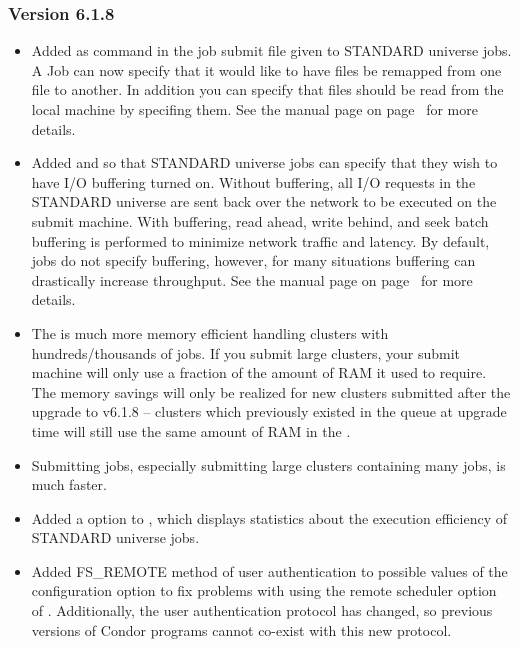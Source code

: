 \subsubsection{\label{sec:New-6-1-8}Version 6.1.8}

\begin{itemize}

\item Added  as command in the job submit file given to
STANDARD universe jobs.
A Job can now specify that it would like to have files be remapped
from one file to another.
In addition you can specify that files should be read from the local machine
by specifing them.
See the  manual page on page~\pageref{man-condor-submit} for
more details.

\item Added  and  so that STANDARD
universe jobs can specify that they wish to have I/O buffering turned on.
Without buffering, all I/O requests in the STANDARD universe are sent back
over the network to be executed on the submit machine.  
With buffering, read ahead, write behind, and seek batch buffering is
performed to minimize network traffic and latency.
By default, jobs do not specify buffering, however, for many situations buffering
can drastically increase throughput.  See the  manual page
on page~\pageref{man-condor-submit} for more details.

\item The  is much more memory efficient handling clusters
with hundreds/thousands of jobs.  
If you submit large clusters, your submit machine will only use a fraction
of the amount of RAM it used to require.  
\Note The memory savings will only be realized for new clusters submitted
after the upgrade to v6.1.8 -- clusters which previously existed in the
queue at upgrade time will still use the same amount of RAM in the
.

\item Submitting jobs, especially submitting large clusters containing many
jobs, is much faster.

\item Added a  option to , which displays
statistics about the execution efficiency of STANDARD universe jobs.

\item Added FS\_REMOTE method of user authentication to possible values
of the configuration option  to fix problems
with using the  remote scheduler option of .
Additionally, the user authentication protocol has changed, so previous
versions of Condor programs cannot co-exist with this new protocol.


\end{itemize}
